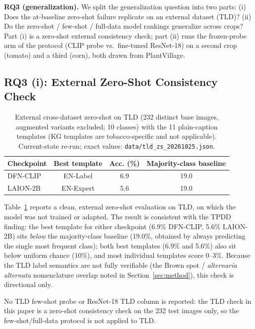 \documentclass[10pt,a4paper]{article}
\begin{document}
\textbf{RQ3 (generalization).} We split the generalization question into two parts: (i) Does the at-baseline zero-shot failure replicate on an external dataset (TLD)? (ii) Do the zero-shot / few-shot / full-data model rankings generalize across crops? Part (i) is a zero-shot external consistency check; part (ii) runs the frozen-probe arm of the protocol (CLIP probe vs.\ fine-tuned ResNet-18) on a second crop (tomato) and a third (corn), both drawn from PlantVillage.

\subsection{RQ3 (i): External Zero-Shot Consistency Check}

\begin{table}[!ht]
\centering
\caption{External cross-dataset zero-shot on TLD (232 distinct base images, augmented variants excluded; 10 classes) with the 11 plain-caption templates (KG templates are tobacco-specific and not applicable). Current-state re-run; exact values: \texttt{data/tld\_zs\_20261025.json}.}
\label{tab:tld}
\begin{tabular}{lccc}
\toprule
\textbf{Checkpoint} & \textbf{Best template} & \textbf{Acc. (\%)} & \textbf{Majority-class baseline} \\
\midrule
DFN-CLIP   & EN-Label  & 6.9  & 19.0 \\
LAION-2B   & EN-Expert & 5.6  & 19.0 \\
\bottomrule
\end{tabular}
\end{table}

Table~\ref{tab:tld} reports a clean, external zero-shot evaluation on TLD, on which the model was not trained or adapted.
The result is consistent with the TPDD finding: the best template for either checkpoint (6.9\% DFN-CLIP, 5.6\% LAION-2B) sits \emph{below} the majority-class baseline (19.0\%, obtained by always predicting the single most frequent class); both best templates (6.9\% and 5.6\%) also sit below uniform chance (10\%), and most individual templates score 0--3\%.
Because the TLD label semantics are not fully verifiable (the Brown spot / \textit{alternaria alternata} nomenclature overlap noted in Section~\ref{sec:method}), this check is directional only.

No TLD few-shot probe or ResNet-18 TLD column is reported: the TLD check in this paper is a zero-shot consistency check on the 232 test images only, so the few-shot/full-data protocol is not applied to TLD.
\end{document}
